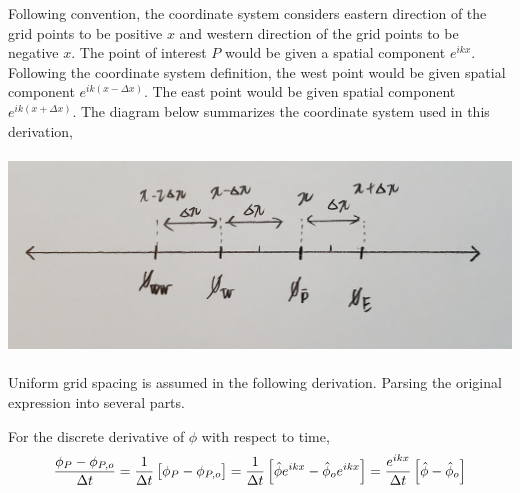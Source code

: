 \documentclass[class=report, 12pt, crop=false]{standalone}
\def\sized{0.14}
\begin{document}
\begin{center}
Following convention, the coordinate system considers eastern direction of the grid points to be positive $x$ and western direction of the grid points to be negative $x$. The point of interest $P$ would be given a spatial component $e^{ikx}$. Following the coordinate system definition, the west point would be given spatial component $e^{ik(x-\Delta x)}$. The east point would be given spatial component $e^{ik(x+\Delta x)}$. The diagram below summarizes the coordinate system used in this derivation,
\\~\\\includegraphics[scale=\sized]{Mambah.jpg}
\\~\\Uniform grid spacing is assumed in the following derivation. Parsing the original expression into several parts. 



For the discrete derivative of $\phi$ with respect to time,
$$\frac{\phi_{P} - \phi_{P,o}}{\Delta t} = \frac{1}{\Delta t}\left[\phi_{P} - \phi_{P,o}\right] = \frac{1}{\Delta t}\left[\hat{\phi}e^{ikx} - \hat{\phi}_oe^{ikx}\right] = \frac{e^{ikx}}{\Delta t}\left[\hat{\phi} - \hat{\phi}_o\right]$$


\end{center}
\end{document}
